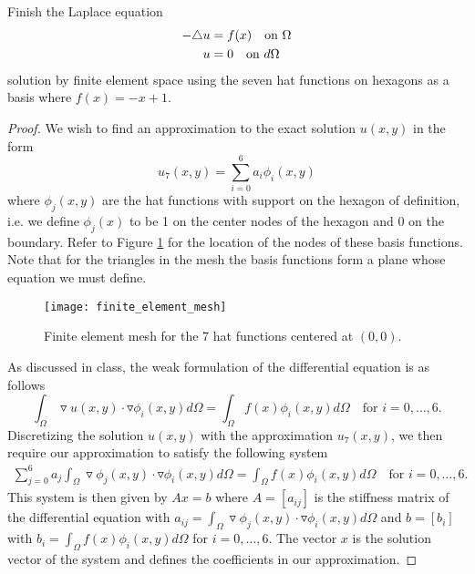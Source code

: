 \begin{problem}
  Finish the Laplace equation
  \begin{align}\label{laplace}
    -\triangle u &= f(x) \quad \text{on $\Omega$} \notag \\
    u &= 0 \quad \text{on $d\Omega$}
  \end{align}
  solution by finite element
  space using the seven hat functions on hexagons as a basis where $f(x) = -x + 1$.
\end{problem}

\begin{proof}
  We wish to find an approximation to the exact solution $u(x, y)$ in the form
  \[
    u_7(x, y) = \sum_{i=0}^6 a_i \phi_i(x, y)
  \]
  where $\phi_j(x, y)$ are the hat functions with support on the hexagon of definition, i.e.
  we define $\phi_j(x)$ to be 1 on the center nodes of the hexagon and 0 on the boundary.
  Refer to Figure \ref{mesh} for the location of the nodes of these basis functions.
  Note that for the triangles in the mesh the basis functions form a plane whose equation we must define.

  \begin{figure}[h!]
    \begin{center}
      \texttt{[image: finite\_element\_mesh]}
    \end{center}
    \caption{Finite element mesh for the 7 hat functions centered at $(0, 0)$.}\label{mesh}
  \end{figure}

  As discussed in class, the weak formulation of the differential equation
  \label{laplace} is as follows
  \[
    \int_\Omega \triangledown u(x, y) \cdot \triangledown\phi_i(x, y) d\Omega = \int_\Omega f(x)\phi_i(x, y)d\Omega \quad \text{for $i=0,\dots,6$}.
  \]
  Discretizing the solution $u(x, y)$ with the approximation $u_7(x, y)$, we
  then require our approximation to satisfy the following system
  \begin{align}\label{laplace_system}
    \sum_{j=0}^6 a_j \int_\Omega \triangledown \phi_j(x, y) \cdot \triangledown \phi_i(x, y) d\Omega = \int_\Omega f(x)\phi_i(x, y)d\Omega \quad \text{for $i=0,\dots,6$}.
  \end{align}
  This system is then given by $Ax = b$ where $A = [a_{ij}]$ is the stiffness matrix
  of the differential equation with $a_{ij} = \int_\Omega \triangledown \phi_j(x, y) \cdot \triangledown \phi_i(x, y) d\Omega$
  and $b = [b_i]$ with $b_i = \int_\Omega f(x)\phi_i(x, y)d\Omega$ for $i=0,\dots,6$. The vector $x$ is the solution vector of the system
  and defines the coefficients in our approximation.

\end{proof}
